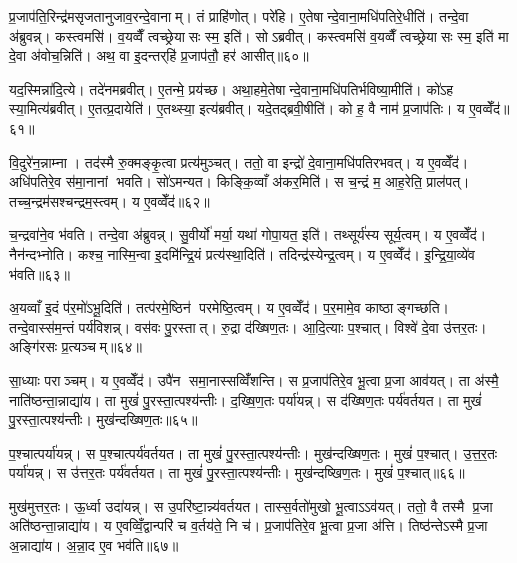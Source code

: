 प्र॒जाप॑ति॒रिन्द्र॑मसृजतानुजाव॒रन्दे॒वानाम्। तं प्राहि॑णोत्। परे॑हि। ए॒तेषान्दे॒वाना॒मधि॑पतिरे॒धीति॑। तन्दे॒वा अ॑ब्रुवन्न्। कस्त्वमसि॑। व॒यव्वैँ त्वच्छ्रेयासः स्म॒ इति॑। सोऽब्रवीत्। कस्त्वमसि॑ व॒यव्वैँ त्वच्छ्रेयासः स्म॒ इति॑ मा दे॒वा अ॑वोच॒न्निति॑। अथ॒ वा इ॒दन्तर्‌हि॑ प्र॒जाप॑तौ॒ हर॑ आसीत्॥६०॥

यद॒स्मिन्ना॑दि॒त्ये। तदे॑नमब्रवीत्। ए॒तन्मे॒ प्रय॑च्छ। अथा॒हमे॒तेषान्दे॒वाना॒मधि॑पतिर्भविष्या॒मीति॑। को॑ऽह स्या॒मित्य॑ब्रवीत्। ए॒तत्प्र॒दायेति॑। ए॒तथ्स्या॒ इत्य॑ब्रवीत्। यदे॒तद्ब्रवी॒षीति॑। को ह॒ वै नाम॑ प्र॒जाप॑तिः। य ए॒वव्वेँद॑॥६१॥

वि॒दुरे॑न॒न्नाम्ना। तद॑स्मै रु॒क्मङ्कृ॒त्वा प्रत्य॑मुञ्चत्। ततो॒ वा इन्द्रो॑ दे॒वाना॒मधि॑पतिरभवत्। य ए॒वव्वेँद॑। अधि॑पतिरे॒व स॑मा॒नानां भवति। सो॑ऽमन्यत। किङ्कि॒व्वाँ अ॑कर॒मिति॑। स च॒न्द्रं म॒ आह॒रेति॒ प्राल॑पत्। तच्च॒न्द्रम॑सश्चन्द्रम॒स्त्वम्। य ए॒वव्वेँद॑॥६२॥

च॒न्द्रवा॑ने॒व भ॑वति। तन्दे॒वा अ॑ब्रुवन्न्। सु॒वीर्यो॑ मर्या॒ यथा॑ गोपा॒यत॒ इति॑। तथ्सूर्य॑स्य सूर्य॒त्वम्। य ए॒वव्वेँद॑। नैन॑न्दभ्नोति। कश्च॒ नास्मि॒न्वा इ॒दमि॑न्द्रि॒यं प्रत्य॑स्था॒दिति॑। तदिन्द्र॑स्येन्द्र॒त्वम्। य ए॒वव्वेँद॑। इ॒न्द्रि॒या॒व्ये॑व भ॑वति॥६३॥

अ॒यव्वाँ इ॒दं प॑र॒मो॑ऽभू॒दिति॑। तत्प॑रमे॒ष्ठिन॑ परमेष्ठि॒त्वम्। य ए॒वव्वेँद॑। प॒र॒मामे॒व काष्ठाङ्गच्छति। तन्दे॒वास्स॑म॒न्तं पर्य॑विशन्न्। वस॑वः पु॒रस्तात्। रु॒द्रा द॑ख्षिण॒तः। आ॒दि॒त्याः प॒श्चात्। विश्वे॑ दे॒वा उ॑त्तर॒तः। अङ्गि॑रसः प्र॒त्यञ्चम्॥६४॥

सा॒ध्याः पराञ्चम्। य ए॒वव्वेँद॑। उपै॑न समा॒नास्सव्विँ॑शन्ति। स प्र॒जाप॑तिरे॒व भू॒त्वा प्र॒जा आव॑यत्। ता अ॑स्मै॒ नाति॑ष्ठन्ता॒न्नाद्या॑य। ता मुखं॑ पु॒रस्ता॒त्पश्य॑न्तीः। द॒ख्षि॒ण॒तः पर्या॑यन्न्। स द॑ख्षिण॒तः पर्य॑वर्तयत। ता मुखं॑ पु॒रस्ता॒त्पश्य॑न्तीः। मुख॑न्दख्षिण॒तः॥६५॥

प॒श्चात्पर्या॑यन्न्। स प॒श्चात्पर्य॑वर्तयत। ता मुखं॑ पु॒रस्ता॒त्पश्य॑न्तीः। मुख॑न्दख्षिण॒तः। मुखं॑ प॒श्चात्। उ॒त्त॒र॒तः पर्या॑यन्न्। स उ॑त्तर॒तः पर्य॑वर्तयत। ता मुखं॑ पु॒रस्ता॒त्पश्य॑न्तीः। मुख॑न्दष्खिण॒तः। मुखं॑ प॒श्चात्॥६६॥

मुख॑मुत्तर॒तः। ऊ॒र्ध्वा उदा॑यन्न्। स उ॒परि॑ष्टा॒न्न्य॑वर्तयत। तास्स॒र्वतो॑मुखो भू॒त्वाऽऽव॑यत्। ततो॒ वै तस्मै प्र॒जा अति॑ष्ठन्ता॒न्नाद्या॑य। य ए॒वव्विँ॒द्वान्परि॑ च व॒र्तय॑ते॒ नि च॑। प्र॒जाप॑तिरे॒व भू॒त्वा प्र॒जा अ॑त्ति। तिष्ठ॑न्तेऽस्मै प्र॒जा अ॒न्नाद्या॑य। अ॒न्ना॒द ए॒व भव॑ति॥६७॥\anuvakamend[आ॒सी॒द्वेद॑ चन्द्रम॒स्त्वय्यँ ए॒वव्वेँदेन्द्रिया॒व्ये॑व भ॑वति प्र॒त्यञ्चं॒ मुख॑न्दख्षिण॒तो मुखं॑ प॒श्चान्नव॑ च]

